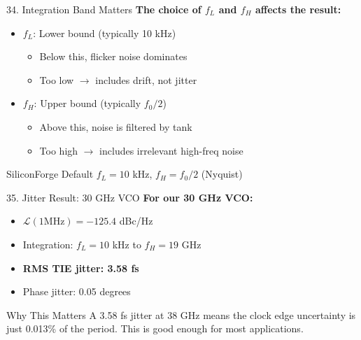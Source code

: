 \documentclass[aspectratio=169, 11pt]{beamer}
\begin{document}
\begin{frame}{34. Integration Band Matters}
    \textbf{The choice of $f_L$ and $f_H$ affects the result:}

    \vspace{0.5em}
    \begin{itemize}
        \item $f_L$: Lower bound (typically 10 kHz)
        \begin{itemize}
            \item Below this, flicker noise dominates
            \item Too low $\rightarrow$ includes drift, not jitter
        \end{itemize}
        \item $f_H$: Upper bound (typically $f_0/2$)
        \begin{itemize}
            \item Above this, noise is filtered by tank
            \item Too high $\rightarrow$ includes irrelevant high-freq noise
        \end{itemize}
    \end{itemize}

    \vspace{0.5em}
    \begin{block}{SiliconForge Default}
        $f_L = 10$ kHz, $f_H = f_0/2$ (Nyquist)
    \end{block}
\end{frame}

\begin{frame}{35. Jitter Result: 30 GHz VCO}
    \textbf{For our 30 GHz VCO:}

    \vspace{0.5em}
    \begin{itemize}
        \item $\mathcal{L}(1\text{MHz}) = -125.4$ dBc/Hz
        \item Integration: $f_L = 10$ kHz to $f_H = 19$ GHz
        \item \textbf{RMS TIE jitter: 3.58 fs}
        \item Phase jitter: 0.05 degrees
    \end{itemize}

    \vspace{0.5em}
    \begin{block}{Why This Matters}
        A 3.58 fs jitter at 38 GHz means the clock edge uncertainty is just 0.013\% of the period. This is good enough for most applications.
    \end{block}
\end{frame}
\end{document}
